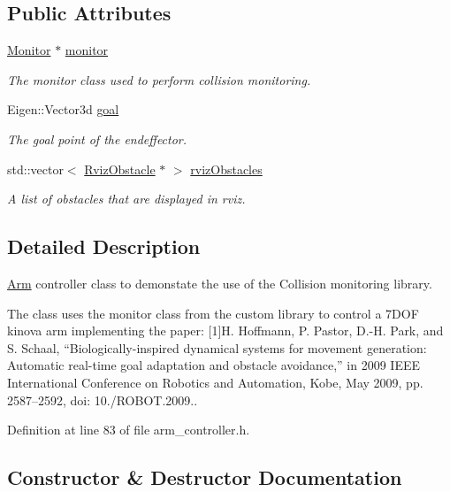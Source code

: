 \subsection*{Public Attributes}
\begin{DoxyCompactItemize}
\item 
\hyperlink{class_monitor}{Monitor} $\ast$ \hyperlink{class_arm_controller_a939747279bba6db315f80092a74c2629}{monitor}
\begin{DoxyCompactList}\small\item\em The monitor class used to perform collision monitoring. \end{DoxyCompactList}\item 
Eigen\+::\+Vector3d \hyperlink{class_arm_controller_a5246aa4a2072b1511d510717fc253f88}{goal}
\begin{DoxyCompactList}\small\item\em The goal point of the endeffector. \end{DoxyCompactList}\item 
std\+::vector$<$ \hyperlink{class_rviz_obstacle}{Rviz\+Obstacle} $\ast$ $>$ \hyperlink{class_arm_controller_ab94a1abce40096f6476404d49d00860f}{rviz\+Obstacles}
\begin{DoxyCompactList}\small\item\em A list of obstacles that are displayed in rviz. \end{DoxyCompactList}\end{DoxyCompactItemize}


\subsection{Detailed Description}
\hyperlink{class_arm}{Arm} controller class to demonstate the use of the Collision monitoring library.

The class uses the monitor class from the custom library to control a 7\+D\+OF kinova arm implementing the paper\+: \mbox{[}1\mbox{]}H. Hoffmann, P. Pastor, D.-\/H. Park, and S. Schaal, “\+Biologically-\/inspired dynamical systems for movement generation\+: Automatic real-\/time goal adaptation and obstacle avoidance,” in 2009 I\+E\+EE International Conference on Robotics and Automation, Kobe, May 2009, pp. 2587–2592, doi\+: 10./\+R\+O\+B\+OT.2009.. 

Definition at line 83 of file arm\+\_\+controller.\+h.



\subsection{Constructor \& Destructor Documentation}
